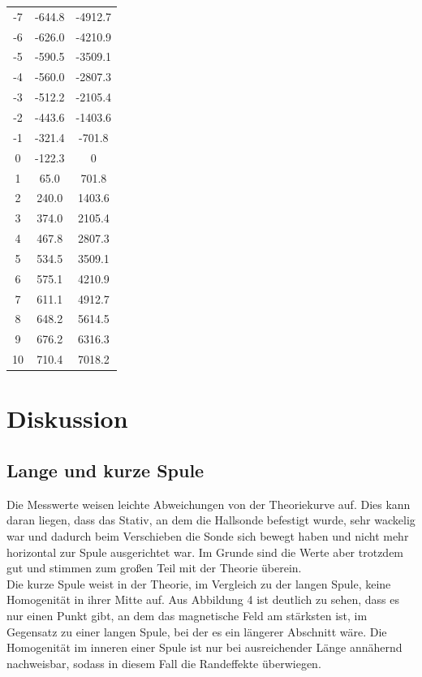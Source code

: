 \documentclass[
  bibliography=totoc,     %
  captions=tableheading,  %
  titlepage=firstiscover, %
]{scrartcl}
\begin{document}
\begin{table}
\begin{tabular}{c c c}
      -7 & -644.8 & -4912.7\\
      -6 & -626.0 & -4210.9\\
      -5 & -590.5 & -3509.1\\
      -4 & -560.0 & -2807.3\\
      -3 & -512.2 & -2105.4\\
      -2 & -443.6 & -1403.6\\
      -1 & -321.4 & -701.8\\
      0 & -122.3 & 0\\
      1 & 65.0 & 701.8\\
      2 & 240.0 & 1403.6\\
      3 & 374.0 & 2105.4\\
      4 & 467.8 & 2807.3\\
      5 & 534.5 & 3509.1\\
      6 & 575.1 & 4210.9\\
      7 & 611.1 & 4912.7\\
      8 & 648.2 & 5614.5\\
      9 & 676.2 & 6316.3\\
      10 & 710.4 & 7018.2\\
      
      \bottomrule
    \end{tabular}
  \end{table}

  
  \newpage
  \section{Diskussion}

  \subsection{Lange und kurze Spule}

  Die Messwerte weisen leichte Abweichungen von der Theoriekurve auf. Dies kann daran liegen, dass
  das Stativ, an dem die Hallsonde befestigt wurde, sehr wackelig war und dadurch beim Verschieben die Sonde sich bewegt haben
  und nicht mehr horizontal zur Spule ausgerichtet war. Im Grunde sind die Werte aber trotzdem gut und stimmen zum großen 
  Teil mit der Theorie überein.\\
  Die kurze Spule weist in der Theorie, im Vergleich zu der langen Spule, keine Homogenität in ihrer Mitte auf. Aus Abbildung 4
  ist deutlich zu sehen, dass es nur einen Punkt gibt, an dem das magnetische Feld am stärksten ist, im Gegensatz zu einer langen
  Spule, bei der es ein längerer Abschnitt wäre. Die Homogenität im inneren einer Spule ist nur bei ausreichender Länge annähernd
  nachweisbar, sodass in diesem Fall die Randeffekte überwiegen.
\end{document}
